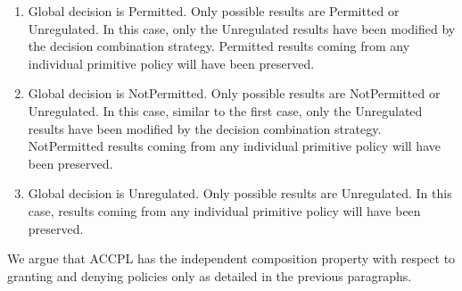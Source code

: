 \begin{enumerate}
  \item Global decision is Permitted. Only possible results are Permitted or Unregulated. In this case, only the Unregulated results have been modified by the decision combination strategy. Permitted results coming from any individual primitive policy will have been preserved.
  \item Global decision is NotPermitted. Only possible results are NotPermitted or Unregulated. In this case, similar to the first case, only the Unregulated results have been modified by the decision combination strategy. NotPermitted results coming from any individual primitive policy will have been preserved.
   \item Global decision is Unregulated. Only possible results are Unregulated.  In this case, results coming from any individual primitive policy will have been preserved.
\end{enumerate}

We argue that \ac{ACCPL} has the independent composition property with respect to granting and denying policies only as detailed in the previous paragraphs. 





























